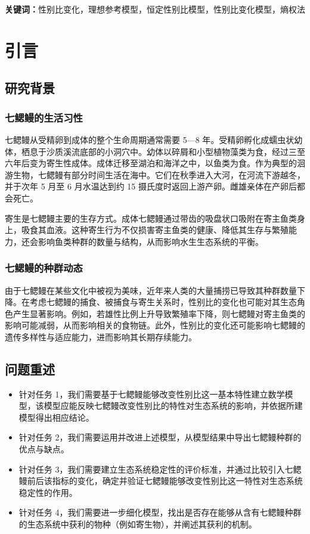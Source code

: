 \documentclass[11pt,a4paper]{ctexart}
\begin{document}
\vspace{6pt}
\noindent\textbf{关键词：}性别比变化，理想参考模型，恒定性别比模型，性别比变化模型，熵权法

\newpage
\pagestyle{fancy}

\section{引言}

\subsection{研究背景}

\subsubsection{七鳃鳗的生活习性}

七鳃鳗从受精卵到成体的整个生命周期通常需要 5—8 年。受精卵孵化成蠕虫状幼体，栖息于沙质溪流底部的小洞穴中。幼体以碎屑和小型植物藻类为食，经过三至六年后变为寄生性成体。成体迁移至湖泊和海洋之中，以鱼类为食。作为典型的洄游生物，七鳃鳗有部分时间生活在海中。它们在秋季进入大河，在河流下游越冬，并于次年 5 月至 6 月水温达到约 15 摄氏度时返回上游产卵。雌雄亲体在产卵后都会死亡。

寄生是七鳃鳗主要的生存方式。成体七鳃鳗通过带齿的吸盘状口吸附在寄主鱼类身上，吸食其血液。这种寄生行为不仅损害寄主鱼类的健康、降低其生存与繁殖能力，还会影响鱼类种群的数量与结构，从而影响水生生态系统的平衡。

\subsubsection{七鳃鳗的种群动态}

由于七鳃鳗在某些文化中被视为美味，近年来人类的大量捕捞已导致其种群数量下降。在考虑七鳃鳗的捕食、被捕食与寄生关系时，性别比的变化也可能对其生态角色产生显著影响。例如，若雄性比例上升导致繁殖率下降，则七鳃鳗对寄主鱼类的影响可能减弱，从而影响相关的食物链。此外，性别比的变化还可能影响七鳃鳗的遗传多样性与适应能力，进而影响其长期存续能力。

\subsection{问题重述}

\begin{itemize}
\item 针对任务 1，我们需要基于七鳃鳗能够改变性别比这一基本特性建立数学模型，该模型应能反映七鳃鳗改变性别比的特性对生态系统的影响，并依据所建模型得出相应结论。
\item 针对任务 2，我们需要运用并改进上述模型，从模型结果中导出七鳃鳗种群的优点与缺点。
\item 针对任务 3，我们需要建立生态系统稳定性的评价标准，并通过比较引入七鳃鳗前后该指标的变化，确定并验证七鳃鳗能够改变性别比这一特性对生态系统稳定性的作用。
\item 针对任务 4，我们需要进一步细化模型，找出是否存在能够从含有七鳃鳗种群的生态系统中获利的物种（例如寄生物），并阐述其获利的机制。
\end{itemize}
\end{document}
